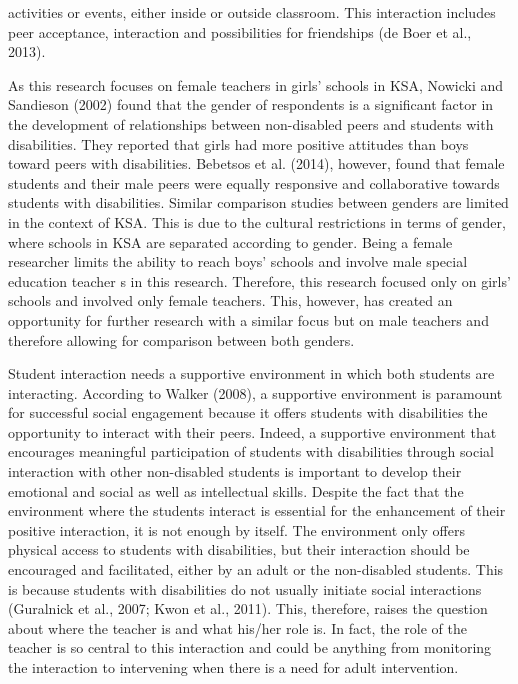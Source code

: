 \documentclass[11pt]{sig-alternate}
\begin{document}
\begin{large}
activities or events, either inside or outside classroom. This interaction includes peer acceptance, interaction and possibilities for friendships (de Boer et al., 2013).  

As this research focuses on female teachers in girls’ schools in KSA, Nowicki and Sandieson (2002) found that the gender of respondents is a significant factor in the development of relationships between non-disabled peers and students with disabilities. They reported that girls had more positive attitudes than boys toward peers with disabilities. Bebetsos et al. (2014), however, found that female students and their male peers were equally responsive and collaborative towards students with disabilities. Similar comparison studies between genders are limited in the context of KSA. This is due to the cultural restrictions in terms of gender, where schools in KSA are separated according to gender. Being a female researcher limits the ability to reach boys’ schools and involve male special education teacher s in this research. Therefore, this research focused only on girls’ schools and involved only female teachers. This, however, has created an opportunity for further research with a similar focus but on male teachers and therefore allowing for comparison between both genders.  

Student interaction needs a supportive environment in which both students are interacting. According to Walker (2008), a supportive environment is paramount for successful social engagement because it offers students with disabilities the opportunity to interact with their peers. Indeed, a supportive environment that encourages meaningful participation of students with disabilities through social interaction with other non-disabled students is important to develop their emotional and social as well as intellectual skills. Despite the fact that the environment where the students interact is essential for the enhancement of their positive interaction, it is not enough by itself. The environment only offers physical access to students with disabilities, but their interaction should be encouraged and facilitated, either by an adult or the non-disabled students. This is because students with disabilities do not usually initiate social interactions (Guralnick et al., 2007; Kwon et al., 2011). This, therefore, raises the question about where the teacher is and what his/her role is. In fact, the role of the teacher is so central to this interaction and could be anything from monitoring the interaction to intervening when there is a need for adult intervention.


\end{large}
\end{document}
